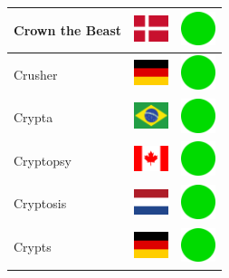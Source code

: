 \documentclass[12pt, a4paper, twoside]{report}
\begin{document}
\begin{center}
\begin{longtable}{|p{5cm}|p{2cm}|p{2cm}|}
 Crown the Beast                                            & \includegraphics[width=1cm]{../4x3/dk} &   \includegraphics[width=1cm]{../likes/y} \\ \hline
 Crusher                                                    & \includegraphics[width=1cm]{../4x3/de} &   \includegraphics[width=1cm]{../likes/y} \\ \hline
 Crypta                                                     & \includegraphics[width=1cm]{../4x3/br} &   \includegraphics[width=1cm]{../likes/y} \\ \hline
 Cryptopsy                                                  & \includegraphics[width=1cm]{../4x3/ca} &   \includegraphics[width=1cm]{../likes/y} \\ \hline
 Cryptosis                                                  & \includegraphics[width=1cm]{../4x3/nl} &   \includegraphics[width=1cm]{../likes/y} \\ \hline
 Crypts                                                     & \includegraphics[width=1cm]{../4x3/de} &   \includegraphics[width=1cm]{../likes/y} \\ \hline

\end{longtable}
\end{center}
\end{document}
